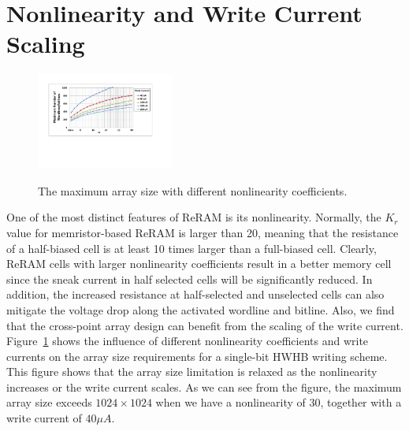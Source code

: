 \vspace{-5pt}
\section{Nonlinearity and Write Current Scaling}\label{sec:scale}
\vspace{-2pt}
\begin{figure}[!b]
\centering
  \vspace{-5pt}
  \includegraphics[width=0.4\textwidth]{./figures/non_linear_f}\\
  \vspace{-10pt}
  \caption{The maximum array size with different nonlinearity coefficients.}\label{fig:non_linear}
\end{figure}
One of the most distinct features of ReRAM is its nonlinearity. Normally,
the $K_r$ value for memristor-based ReRAM is larger than 20, meaning that
the resistance of a half-biased cell is at least 10 times larger than a
full-biased cell. Clearly, ReRAM cells with larger nonlinearity
coefficients result in a better memory cell since the sneak current in
half selected cells will be significantly reduced. In addition, the
increased resistance at half-selected and unselected cells can also
mitigate the voltage drop along the activated wordline and bitline. Also,
we find that the cross-point array design can benefit from the scaling of
the write current. Figure~\ref{fig:non_linear} shows the influence of
different nonlinearity coefficients and write currents on the array size
requirements for a single-bit HWHB writing scheme. This figure shows that
the array size limitation is relaxed as the nonlinearity increases or the
write current scales. As we can see from the figure, the maximum array
size exceeds $1024\times 1024$ when we have a nonlinearity of $30$,
together with a write current of $40\mu A$.

